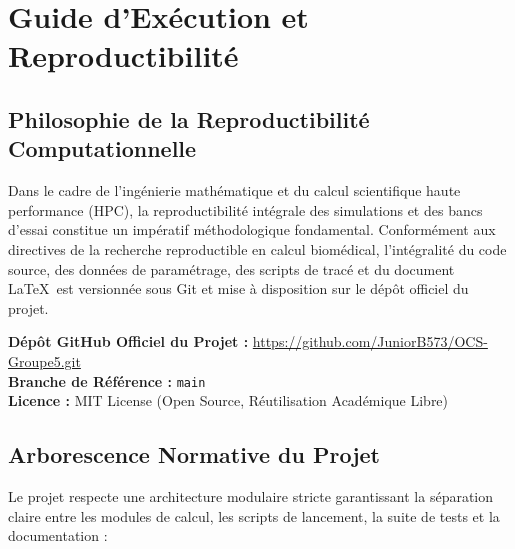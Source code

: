 \documentclass[11pt,a4paper]{report}
\theoremstyle{plain}
\theoremstyle{definition}
\theoremstyle{remark}
\begin{document}
\chapter{Guide d'Exécution et Reproductibilité}

\section{Philosophie de la Reproductibilité Computationnelle}
Dans le cadre de l'ingénierie mathématique et du calcul scientifique haute performance (HPC), la reproductibilité intégrale des simulations et des bancs d'essai constitue un impératif méthodologique fondamental. Conformément aux directives de la recherche reproductible en calcul biomédical, l'intégralité du code source, des données de paramétrage, des scripts de tracé et du document \LaTeX\ est versionnée sous Git et mise à disposition sur le dépôt officiel du projet.

\begin{tcolorbox}[colback=lightbg,colframe=navyblue!70,arc=3pt,boxrule=0.7pt]
\textbf{Dépôt GitHub Officiel du Projet :} \url{https://github.com/JuniorB573/OCS-Groupe5.git}\\
\textbf{Branche de Référence :} \texttt{main}\\
\textbf{Licence :} MIT License (Open Source, Réutilisation Académique Libre)
\end{tcolorbox}

\section{Arborescence Normative du Projet}
Le projet respecte une architecture modulaire stricte garantissant la séparation claire entre les modules de calcul, les scripts de lancement, la suite de tests et la documentation :
\end{document}
